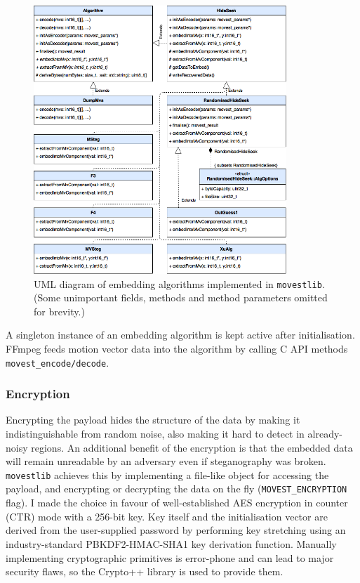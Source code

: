\documentclass[12pt,british,twoside,notitlepage,usenames,dvipsnames,hypens,final]{report}
\numberwithin{equation}{section}
\numberwithin{figure}{section}
\begin{document}
\begin{figure}[tbh]
\centerline{\includegraphics[width=0.85\textwidth, height=\textheight, keepaspectratio]{img/movest_alg_class_diag.png}}
\caption{UML diagram of embedding algorithms implemented in \texttt{movestlib}. (Some unimportant fields, methods and method parameters omitted for brevity.)}
\label{fig:movest_alg_class_diag}
\end{figure}

A singleton instance of an embedding algorithm is kept active after initialisation. FFmpeg feeds motion vector data into the algorithm by calling C API methods \texttt{movest\_encode/decode}.  

\subsubsection{Encryption}
Encrypting the payload hides the structure of the data by making it indistinguishable from random noise, also making it hard to detect in already-noisy regions. An additional benefit of the encryption is that the embedded data will remain unreadable by an adversary even if steganography was broken. \texttt{movestlib} achieves this by implementing a file-like object for accessing the payload, and encrypting or decrypting the data on the fly (\texttt{MOVEST\_ENCRYPTION} flag). I made the choice in favour of well-established AES encryption in counter (CTR) mode with a 256-bit key. Key itself and the initialisation vector are derived from the user-supplied password by performing key stretching using an industry-standard PBKDF2-HMAC-SHA1 key derivation function. Manually implementing cryptographic primitives is error-phone and can lead to major security flaws, so the Crypto++ library is used to provide them. 
\end{document}
